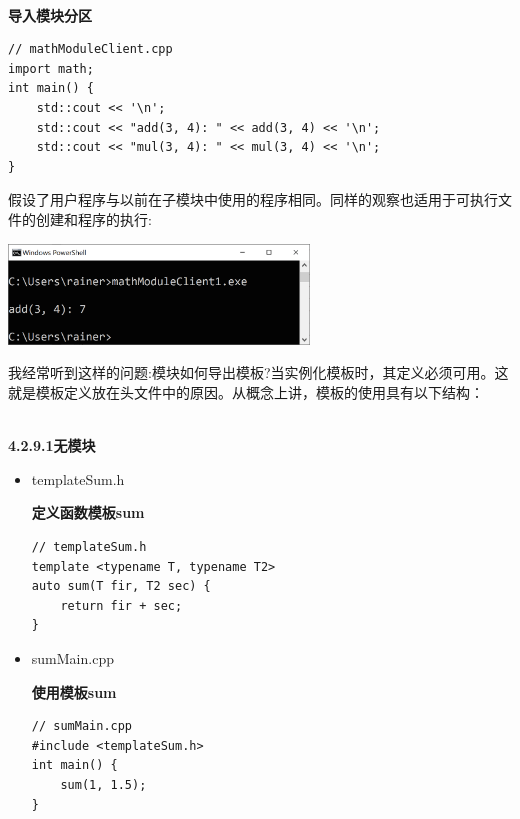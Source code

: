 \hspace*{\fill} \\ %
\noindent
\textbf{导入模块分区}
\begin{lstlisting}[style=styleCXX]
// mathModuleClient.cpp
import math;
int main() {
	std::cout << '\n';
	std::cout << "add(3, 4): " << add(3, 4) << '\n';
	std::cout << "mul(3, 4): " << mul(3, 4) << '\n';
}
\end{lstlisting}

假设了用户程序与以前在子模块中使用的程序相同。同样的观察也适用于可执行文件的创建和程序的执行:

\begin{center}
\includegraphics[width=0.6\textwidth]{content/3/chapter4/images/23.png}\\
\end{center}


我经常听到这样的问题:模块如何导出模板?当实例化模板时，其定义必须可用。这就是模板定义放在头文件中的原因。从概念上讲，模板的使用具有以下结构：

\hspace*{\fill} \\ %
\noindent
\textbf{4.2.9.1\hspace{0.2cm}无模块}

\begin{itemize}
\item 
templateSum.h

\noindent
\textbf{定义函数模板sum}
\begin{lstlisting}[style=styleCXX]
// templateSum.h
template <typename T, typename T2>
auto sum(T fir, T2 sec) {
	return fir + sec;
}
\end{lstlisting}

\item 
sumMain.cpp

\noindent
\textbf{使用模板sum}
\begin{lstlisting}[style=styleCXX]
// sumMain.cpp
#include <templateSum.h>
int main() {
	sum(1, 1.5);
}
\end{lstlisting}
\end{itemize}

